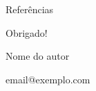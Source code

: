 \begin{frame}[allowframebreaks]{Referências}
  \small
  
\end{frame}

\begin{frame}[plain]
  \centering\vfill
  {\Large{} Obrigado!}\par\bigskip
  Nome do autor\par
  {\small email@exemplo.com}
  \vfill
\end{frame}


